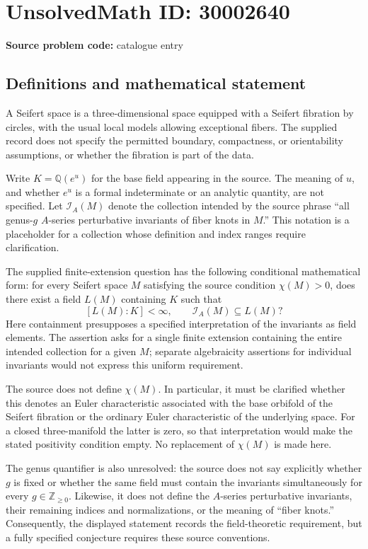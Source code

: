 \documentclass[11pt]{article}
\newcommand{\Z}{\mathbb{Z}}
\newcommand{\Q}{\mathbb{Q}}
\begin{document}
\section*{UnsolvedMath ID: 30002640}
\textbf{Source problem code:} catalogue entry
\subsection{Definitions and mathematical statement}
A Seifert space is a three-dimensional space equipped with a Seifert fibration by circles, with the usual local models allowing exceptional fibers. The supplied record does not specify the permitted boundary, compactness, or orientability assumptions, or whether the fibration is part of the data.

Write \(K=\Q(e^u)\) for the base field appearing in the source. The meaning of \(u\), and whether \(e^u\) is a formal indeterminate or an analytic quantity, are not specified. Let \(\mathcal I_A(M)\) denote the collection intended by the source phrase ``all genus-\(g\) \(A\)-series perturbative invariants of fiber knots in \(M\).'' This notation is a placeholder for a collection whose definition and index ranges require clarification.

The supplied finite-extension question has the following conditional mathematical form: for every Seifert space \(M\) satisfying the source condition \(\chi(M)>0\), does there exist a field \(L(M)\) containing \(K\) such that
\[
 [L(M):K]<\infty,
 \qquad
 \mathcal I_A(M)\subseteq L(M)?
\]
Here containment presupposes a specified interpretation of the invariants as field elements. The assertion asks for a single finite extension containing the entire intended collection for a given \(M\); separate algebraicity assertions for individual invariants would not express this uniform requirement.

The source does not define \(\chi(M)\). In particular, it must be clarified whether this denotes an Euler characteristic associated with the base orbifold of the Seifert fibration or the ordinary Euler characteristic of the underlying space. For a closed three-manifold the latter is zero, so that interpretation would make the stated positivity condition empty. No replacement of \(\chi(M)\) is made here.

The genus quantifier is also unresolved: the source does not say explicitly whether \(g\) is fixed or whether the same field must contain the invariants simultaneously for every \(g\in\Z_{\geq 0}\). Likewise, it does not define the \(A\)-series perturbative invariants, their remaining indices and normalizations, or the meaning of ``fiber knots.'' Consequently, the displayed statement records the field-theoretic requirement, but a fully specified conjecture requires these source conventions.
\end{document}
